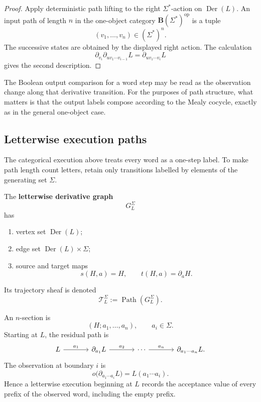 \begin{proof}
Apply deterministic path lifting to the right
\(\Sigma^\ast\)-action on \(\operatorname{Der}(L)\). An input path of
length \(n\) in the one-object category
\(\mathbf B(\Sigma^\ast)^{\mathrm{op}}\) is a tuple
\[
    (v_1,\ldots,v_n)\in(\Sigma^\ast)^n.
\]
The successive states are obtained by the displayed right action. The
calculation
\[
    \partial_{v_i}\partial_{uv_1\cdots v_{i-1}}L
    =
    \partial_{uv_1\cdots v_i}L
\]
gives the second description.
\end{proof}

The Boolean output comparison for a word step may be read as the observation
change along that derivative transition. For the purposes of path structure,
what matters is that the output labels compose according to the Mealy cocycle,
exactly as in the general one-object case.

\subsection{Letterwise execution paths}
\label{subsec:letterwise-derivative-trajectories}

The categorical execution above treats every word as a one-step label. To make
path length count letters, retain only transitions labelled by elements of the
generating set \(\Sigma\).

\begin{definition}
\label{def:letterwise-derivative-trajectory-sheaf}
The \textbf{letterwise derivative graph}
\[
    G_L^\Sigma
\]
has
\begin{enumerate}
    \item vertex set \(\operatorname{Der}(L)\);
    \item edge set \(\operatorname{Der}(L)\times\Sigma\);
    \item source and target maps
    \[
        s(H,a)=H,
        \qquad
        t(H,a)=\partial_aH.
    \]
\end{enumerate}
Its trajectory sheaf is denoted
\[
    \mathscr T_L^\Sigma
    :=
    \operatorname{Path}(G_L^\Sigma).
\]
\end{definition}

An \(n\)-section is
\[
    (H;a_1,\ldots,a_n),
    \qquad
    a_i\in\Sigma.
\]
Starting at \(L\), the residual path is
\[
\begin{tikzcd}[column sep=large]
    L
        \arrow[r, "a_1"]
    &
    \partial_{a_1}L
        \arrow[r, "a_2"]
    &
    \cdots
        \arrow[r, "a_n"]
    &
    \partial_{a_1\cdots a_n}L.
\end{tikzcd}
\]
The observation at boundary \(i\) is
\[
    o\bigl(\partial_{a_1\cdots a_i}L\bigr)
    =
    L(a_1\cdots a_i).
\]
Hence a letterwise execution beginning at \(L\) records the acceptance value
of every prefix of the observed word, including the empty prefix.


